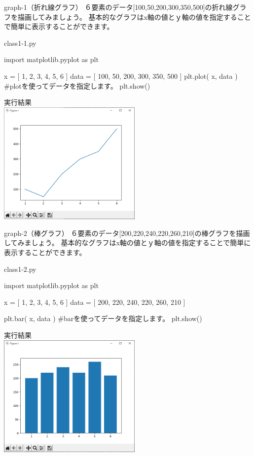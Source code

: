 \newpage
\begin{pabox}{graph-1（折れ線グラフ）}
６要素のデータ[100,50,200,300,350,500]の折れ線グラフを描画してみましょう。
基本的なグラフはx軸の値とｙ軸の値を指定することで簡単に表示することができます。
\begin{legbox}{class1-1.py}
\begin{listing}{1}
import matplotlib.pyplot as plt

x = [ 1, 2, 3, 4, 5, 6 ]
data = [ 100, 50, 200, 300, 350, 500 ]
plt.plot( x, data )
#plotを使ってデータを指定します。
plt.show()
\end{listing}


実行結果\\

\includegraphics[width=7cm]{images/graph1.png} 

\end{legbox}
\end{pabox}
\newpage

\begin{pabox}{graph-2（棒グラフ）}
６要素のデータ[200,220,240,220,260,210]の棒グラフを描画してみましょう。
基本的なグラフはx軸の値とｙ軸の値を指定することで簡単に表示することができます。
\begin{legbox}{class1-2.py}
\begin{listing}{1}
import matplotlib.pyplot as plt

x = [ 1, 2, 3, 4, 5, 6 ]
data = [ 200, 220, 240, 220, 260, 210 ]

plt.bar( x, data )
#barを使ってデータを指定します。
plt.show()
\end{listing}


実行結果\\

\includegraphics[width=7cm]{images/graph2.png} 

\end{legbox}
\end{pabox}

